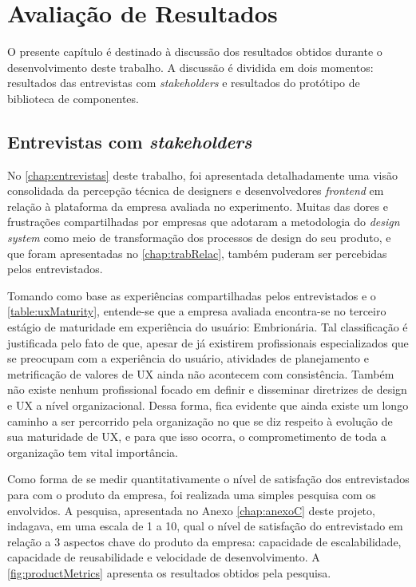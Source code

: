 
\chapter{Avaliação de Resultados}
\label{chap:resultados}

O presente capítulo é destinado à discussão dos resultados obtidos durante o desenvolvimento deste trabalho. A discussão é dividida em dois momentos: resultados das entrevistas com \textit{stakeholders} e resultados do protótipo de biblioteca de componentes.

\section{Entrevistas com \textit{stakeholders}}
\label{sec:resEntrevistas}

No \autoref{chap:entrevistas} deste trabalho, foi apresentada detalhadamente uma visão consolidada da percepção técnica de designers e desenvolvedores \textit{frontend} em relação à plataforma da empresa avaliada no experimento. Muitas das dores e frustrações compartilhadas por empresas que adotaram a metodologia do \textit{design system} como meio de transformação dos processos de design do seu produto, e que foram apresentadas no \autoref{chap:trabRelac}, também puderam ser percebidas pelos entrevistados.

Tomando como base as experiências compartilhadas pelos entrevistados e o \autoref{table:uxMaturity}, entende-se que a empresa avaliada encontra-se no terceiro estágio de maturidade em experiência do usuário: Embrionária. Tal classificação é justificada pelo fato de que, apesar de já existirem profissionais especializados que se preocupam com a experiência do usuário, atividades de planejamento e metrificação de valores de UX ainda não acontecem com consistência. Também não existe nenhum profissional focado em definir e disseminar diretrizes de design e UX a nível organizacional. Dessa forma, fica evidente que ainda existe um longo caminho a ser percorrido pela organização no que se diz respeito à evolução de sua maturidade de UX, e para que isso ocorra, o comprometimento de toda a organização tem vital importância.

Como forma de se medir quantitativamente o nível de satisfação dos entrevistados para com o produto da empresa, foi realizada uma simples pesquisa com os envolvidos. A pesquisa, apresentada no Anexo \ref{chap:anexoC} deste projeto, indagava, em uma escala de 1 a 10, qual o nível de satisfação do entrevistado em relação a 3 aspectos chave do produto da empresa: capacidade de escalabilidade, capacidade de reusabilidade e velocidade de desenvolvimento. A \autoref{fig:productMetrics} apresenta os resultados obtidos pela pesquisa.

